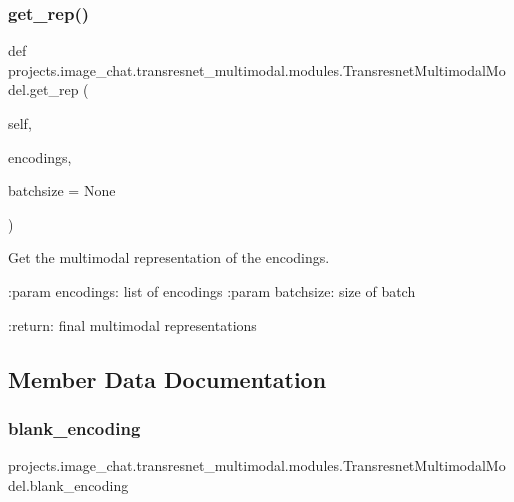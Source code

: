 \subsubsection{\texorpdfstring{get\+\_\+rep()}{get\_rep()}}
{\footnotesize\ttfamily def projects.\+image\+\_\+chat.\+transresnet\+\_\+multimodal.\+modules.\+Transresnet\+Multimodal\+Model.\+get\+\_\+rep (\begin{DoxyParamCaption}\item[{}]{self,  }\item[{}]{encodings,  }\item[{}]{batchsize = {\ttfamily None} }\end{DoxyParamCaption})}

\begin{DoxyVerb}Get the multimodal representation of the encodings.

:param encodings:
    list of encodings
:param batchsize:
    size of batch

:return:
    final multimodal representations
\end{DoxyVerb}
 

\subsection{Member Data Documentation}
\mbox{\label{classprojects_1_1image__chat_1_1transresnet__multimodal_1_1modules_1_1TransresnetMultimodalModel_a276a0538450df1870294a14da9f3bdfc}} 
\subsubsection{\texorpdfstring{blank\+\_\+encoding}{blank\_encoding}}
{\footnotesize\ttfamily projects.\+image\+\_\+chat.\+transresnet\+\_\+multimodal.\+modules.\+Transresnet\+Multimodal\+Model.\+blank\+\_\+encoding}

